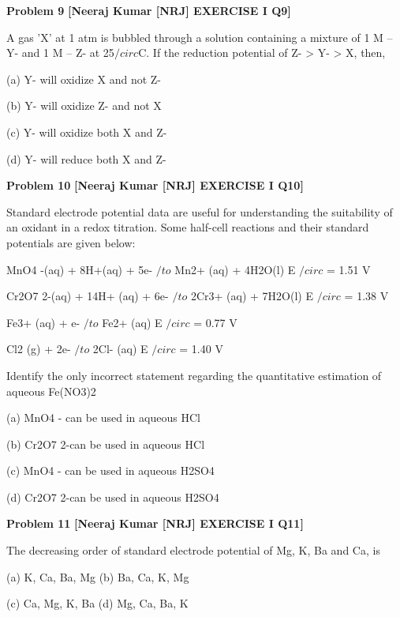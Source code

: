 \begin{problembox}
\textbf{Problem 9} \hfill \textbf{[Neeraj Kumar [NRJ] EXERCISE I Q9]}
\label{q:ext-nrj_all_questions-9}

A gas 'X' at 1 atm is bubbled through a solution 
containing a mixture of 1 M -- Y- and 1 M -- Z- at 
25$/circ$C. If the reduction potential of Z- > Y- > X, 
then,
 
 (a) Y- will oxidize X and not Z-
 
 (b) Y- will oxidize Z- and not X
 
 (c) Y- will oxidize both X and Z-
 
 (d) Y- will reduce both X and Z-
\end{problembox}

\begin{problembox}
\textbf{Problem 10} \hfill \textbf{[Neeraj Kumar [NRJ] EXERCISE I Q10]}
\label{q:ext-nrj_all_questions-10}

Standard electrode potential data are useful for 
understanding the suitability of an oxidant in a 
redox titration. Some half-cell reactions and their 
standard potentials are given below:
 
   MnO4
-(aq) + 8H+(aq) + 5e- $/to$ Mn2+ (aq) + 
4H2O(l)  E $/circ$ = 1.51 V
 
   Cr2O7
2-(aq) + 14H+ (aq) + 6e- $/to$ 2Cr3+ (aq) + 
7H2O(l)  E $/circ$ = 1.38 V
 
   Fe3+ (aq) + e- $/to$ Fe2+ (aq) E $/circ$ = 0.77 V
 
  Cl2 (g) + 2e- $/to$ 2Cl- (aq) E $/circ$ = 1.40 V
 
 Identify the only incorrect statement regarding the 
quantitative estimation of aqueous Fe(NO3)2
 
 (a) MnO4
- can be used in aqueous HCl
 
 (b) Cr2O7
2-can be used in aqueous HCl
 
 (c) MnO4
- can be used in aqueous H2SO4
 
 (d) Cr2O7
2-can be used in aqueous H2SO4
\end{problembox}

\begin{problembox}
\textbf{Problem 11} \hfill \textbf{[Neeraj Kumar [NRJ] EXERCISE I Q11]}
\label{q:ext-nrj_all_questions-11}

The decreasing order of standard electrode 
potential of Mg, K, Ba and Ca, is
 
 (a) K, Ca, Ba, Mg 
(b) Ba, Ca, K, Mg
 
 (c) Ca, Mg, K, Ba 
(d) Mg, Ca, Ba, K
\end{problembox}

